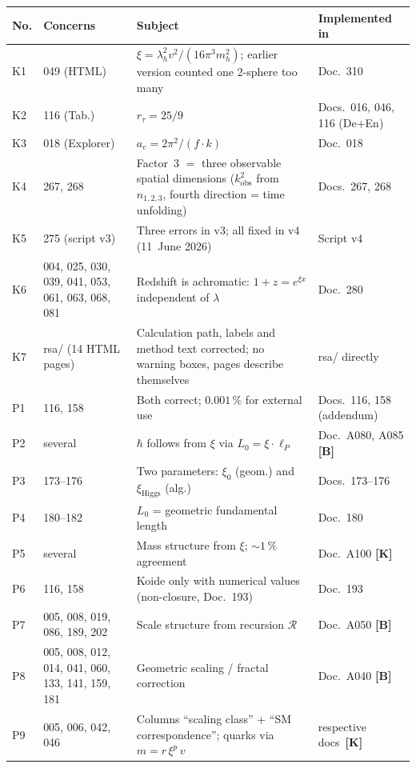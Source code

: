 \begingroup\small
\begin{longtable}{@{}p{1.2cm}p{3.4cm}p{5.8cm}p{3.4cm}@{}}
\toprule
\textbf{No.} & \textbf{Concerns} & \textbf{Subject} & \textbf{Implemented in} \\
\midrule\endhead
\bottomrule\endfoot

K1 & 049 (HTML) & $\xi = \lambda_h^2 v^2/(16\pi^3 m_h^2)$; earlier version counted one 2-sphere too many & Doc.~310 \\
K2 & 116 (Tab.) & $r_\tau = 25/9$ & Docs.~016, 046, 116 (De+En) \\
K3 & 018 (Explorer) & $a_e = 2\pi^2/(f \cdot k)$ & Doc.~018 \\
K4 & 267, 268 & Factor~3 $=$ three observable spatial dimensions ($k_\mathrm{obs}^2$ from $n_{1,2,3}$, fourth direction = time unfolding) & Docs.~267, 268 \\
K5 & 275 (script v3) & Three errors in v3; all fixed in v4 (11~June 2026) & Script v4 \\
K6 & 004, 025, 030, 039, 041, 053, 061, 063, 068, 081 & Redshift is achromatic: $1+z=e^{\xi x}$ independent of $\lambda$ & Doc.~280 \\
K7 & rsa/ (14 HTML pages) & Calculation path, labels and method text corrected; no warning boxes, pages describe themselves & rsa/ directly \\
P1 & 116, 158 & Both correct; $0.001\,\%$ for external use & Docs.~116, 158 (addendum) \\
P2 & several & $\hbar$ follows from $\xi$ via $L_0 = \xi\cdot\ell_P$ & Doc.~A080, A085 \textbf{[B]} \\
P3 & 173--176 & Two parameters: $\xi_0$ (geom.) and $\xi_{\text{Higgs}}$ (alg.) & Docs.~173--176 \\
P4 & 180--182 & $L_0$ = geometric fundamental length & Doc.~180 \\
P5 & several & Mass structure from $\xi$; $\sim 1\,\%$ agreement & Doc.~A100 \textbf{[K]} \\
P6 & 116, 158 & Koide only with numerical values (non-closure, Doc.~193) & Doc.~193 \\
P7 & 005, 008, 019, 086, 189, 202 & Scale structure from recursion $\mathcal{R}$ & Doc.~A050 \textbf{[B]} \\
P8 & 005, 008, 012, 014, 041, 060, 133, 141, 159, 181 & Geometric scaling / fractal correction & Doc.~A040 \textbf{[B]} \\
P9 & 005, 006, 042, 046 & Columns ``scaling class'' + ``SM correspondence''; quarks via $m = r\,\xi^p\,v$ & respective docs~\textbf{[K]} \\

\end{longtable}
